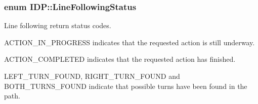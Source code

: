 \hypertarget{namespaceIDP_a5993bdfdd901fc5521c8df42dca43bd0}{
\subsubsection[{LineFollowingStatus}]{\setlength{\rightskip}{0pt plus 5cm}enum {\bf IDP::LineFollowingStatus}}}
\label{namespaceIDP_a5993bdfdd901fc5521c8df42dca43bd0}


Line following return status codes. 

ACTION\_\-IN\_\-PROGRESS indicates that the requested action is still underway.

ACTION\_\-COMPLETED indicates that the requested action has finished.

LEFT\_\-TURN\_\-FOUND, RIGHT\_\-TURN\_\-FOUND and BOTH\_\-TURNS\_\-FOUND indicate that possible turns have been found in the path.

